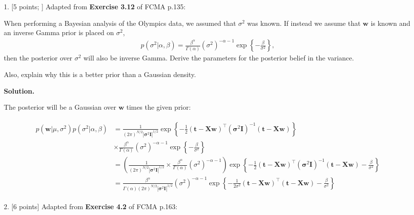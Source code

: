\documentclass[10pt]{article}
\begin{document}
\newpage
\begin{itemize}

\item[1.]  [5 points; \boldred{Required only for Graduates}]
Adapted from {\bf Exercise 3.12} of FCMA p.135:

When performing a Bayesian analysis of the Olympics data, we assumed that $\sigma^2$ was known.  If instead we assume that $\mathbf{w}$ is known and an inverse Gamma prior is placed on $\sigma^2$,
\begin{eqnarray*}
p(\sigma^2 | \alpha, \beta) = \frac{\beta^{\alpha}}{\Gamma(\alpha)} (\sigma^2)^{-\alpha-1} \exp \left\{-\frac{\beta}{\sigma^2} \right\},
\end{eqnarray*}
then the posterior over $\sigma^2$ will also be inverse Gamma.  Derive the parameters for the posterior belief in the variance.  

Also, explain why this is a better prior than a Gaussian density.

{\bf Solution.}

The posterior will be a Gaussian over $\mathbf{w}$ times the given prior:

\begin{eqnarray*}
\begin{aligned}
p(\mathbf{w}|\mu, \sigma^2) p(\sigma^2 | \alpha, \beta) &= 
\frac{1}{(2 \pi)^{N/2} | \mathbf{\sigma}^2 \mathbf{I}|^{1/2}} 
\exp 
\left\{ 
-\frac{1}{2} 
(\mathbf{t} - \mathbf{X}\mathbf{w})^\top 
(\mathbf{\sigma}^2 \mathbf{I})^{-1} 
(\mathbf{t} - \mathbf{X}\mathbf{w}) 
\right\}
\\
&\times
\frac{\beta^{\alpha}}{\Gamma(\alpha)} (\sigma^2)^{-\alpha-1} 
\exp \left\{-\frac{\beta}{\sigma^2} \right\}
\\
&=
\left(
\frac{1}{(2 \pi)^{N/2} | \mathbf{\sigma}^2 \mathbf{I}|^{1/2}} 
\times
\frac{\beta^{\alpha}}{\Gamma(\alpha)} (\sigma^2)^{-\alpha-1}
\right)
\exp \left\{
-\frac{1}{2} (\mathbf{t} - \mathbf{X}\mathbf{w})^\top 
(\mathbf{\sigma}^2 \mathbf{I})^{-1} (\mathbf{t} - \mathbf{X}\mathbf{w}) 
-
\frac{\beta}{\sigma^2} 
\right\}
\\
&=
\frac{\beta^{\alpha}}{\Gamma(\alpha)(2 \pi)^{N/2} | \mathbf{\sigma}^2 \mathbf{I}|^{1/2}}
(\sigma^2)^{-\alpha-1}
\exp \left\{
-\frac{1}{2\sigma^2} (\mathbf{t} - \mathbf{X}\mathbf{w})^\top (\mathbf{t} - \mathbf{X}\mathbf{w})
- \frac{\beta}{\sigma^2}
\right\}
\end{aligned}
\end{eqnarray*}

\item[2.]  [6 points]
Adapted from {\bf Exercise 4.2} of FCMA p.163:


\end{itemize}
\end{document}
